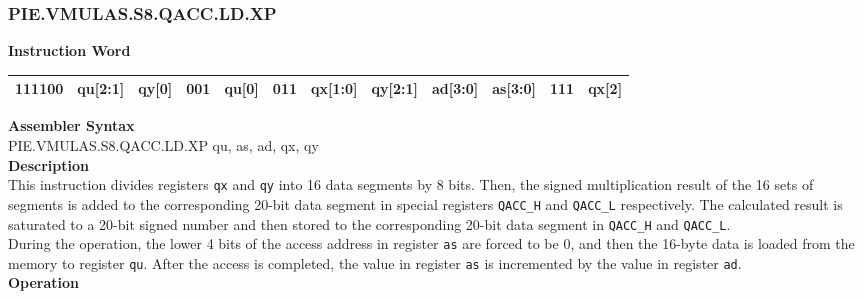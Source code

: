 \newpage
\subsubsection{PIE.VMULAS.S8.QACC.LD.XP}\label{instruction:PIEVMULASS8QACCLDXP}
\setlength\tabcolsep{6pt}
\textbf{Instruction Word} \\
\begin{tabular}{|c|c|c|c|c|c|c|c|c|c|c|c|}
	\hline
	111100 & qu[2:1] & qy[0] & 001 & qu[0] & 011 & qx[1:0] & qy[2:1] & ad[3:0] & as[3:0] & 111 & qx[2] \\
	\hline
\end{tabular}

\textbf{Assembler Syntax} \\
PIE.VMULAS.S8.QACC.LD.XP qu, as, ad, qx, qy \\
\textbf{Description} \\
This instruction divides registers \lstinline{qx} and \lstinline{qy} into 16 data segments by 8 bits. Then, the signed multiplication result of the 16 sets of segments is added to the corresponding 20-bit data segment in special registers \lstinline{QACC_H} and \lstinline{QACC_L} respectively. The calculated result is saturated to a 20-bit signed number and then stored to the corresponding 20-bit data segment in \lstinline{QACC_H} and \lstinline{QACC_L}.\\
During the operation, the lower 4 bits of the access address in register \lstinline{as} are forced to be 0, and then the 16-byte data is loaded from the memory to register \lstinline{qu}. After the access is completed, the value in register \lstinline{as} is incremented by the value in register \lstinline{ad}.\\
\textbf{Operation}

